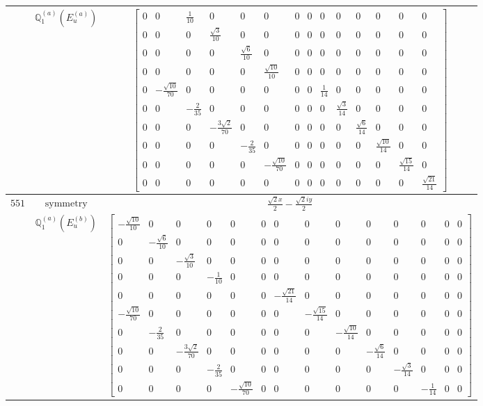 \documentclass[fleqn,8pt,landscape]{jsarticle}
\begin{document}
\begin{longtable}{ccc}
$  $ & $ \mathbb{Q}_{1}^{(a)}(E_{u}^{(a)}) $ & $ \begin{bmatrix} 0 & 0 & \frac{1}{10} & 0 & 0 & 0 & 0 & 0 & 0 & 0 & 0 & 0 & 0 & 0 \\ 0 & 0 & 0 & \frac{\sqrt{3}}{10} & 0 & 0 & 0 & 0 & 0 & 0 & 0 & 0 & 0 & 0 \\ 0 & 0 & 0 & 0 & \frac{\sqrt{6}}{10} & 0 & 0 & 0 & 0 & 0 & 0 & 0 & 0 & 0 \\ 0 & 0 & 0 & 0 & 0 & \frac{\sqrt{10}}{10} & 0 & 0 & 0 & 0 & 0 & 0 & 0 & 0 \\ 0 & - \frac{\sqrt{10}}{70} & 0 & 0 & 0 & 0 & 0 & 0 & \frac{1}{14} & 0 & 0 & 0 & 0 & 0 \\ 0 & 0 & - \frac{2}{35} & 0 & 0 & 0 & 0 & 0 & 0 & \frac{\sqrt{3}}{14} & 0 & 0 & 0 & 0 \\ 0 & 0 & 0 & - \frac{3 \sqrt{2}}{70} & 0 & 0 & 0 & 0 & 0 & 0 & \frac{\sqrt{6}}{14} & 0 & 0 & 0 \\ 0 & 0 & 0 & 0 & - \frac{2}{35} & 0 & 0 & 0 & 0 & 0 & 0 & \frac{\sqrt{10}}{14} & 0 & 0 \\ 0 & 0 & 0 & 0 & 0 & - \frac{\sqrt{10}}{70} & 0 & 0 & 0 & 0 & 0 & 0 & \frac{\sqrt{15}}{14} & 0 \\ 0 & 0 & 0 & 0 & 0 & 0 & 0 & 0 & 0 & 0 & 0 & 0 & 0 & \frac{\sqrt{21}}{14} \end{bmatrix} $ \\ \hline
$ 551 $ & $ \text{symmetry} $ & $ \frac{\sqrt{2} x}{2} - \frac{\sqrt{2} i y}{2} $ \\
$  $ & $ \mathbb{Q}_{1}^{(a)}(E_{u}^{(b)}) $ & $ \begin{bmatrix} - \frac{\sqrt{10}}{10} & 0 & 0 & 0 & 0 & 0 & 0 & 0 & 0 & 0 & 0 & 0 & 0 & 0 \\ 0 & - \frac{\sqrt{6}}{10} & 0 & 0 & 0 & 0 & 0 & 0 & 0 & 0 & 0 & 0 & 0 & 0 \\ 0 & 0 & - \frac{\sqrt{3}}{10} & 0 & 0 & 0 & 0 & 0 & 0 & 0 & 0 & 0 & 0 & 0 \\ 0 & 0 & 0 & - \frac{1}{10} & 0 & 0 & 0 & 0 & 0 & 0 & 0 & 0 & 0 & 0 \\ 0 & 0 & 0 & 0 & 0 & 0 & - \frac{\sqrt{21}}{14} & 0 & 0 & 0 & 0 & 0 & 0 & 0 \\ - \frac{\sqrt{10}}{70} & 0 & 0 & 0 & 0 & 0 & 0 & - \frac{\sqrt{15}}{14} & 0 & 0 & 0 & 0 & 0 & 0 \\ 0 & - \frac{2}{35} & 0 & 0 & 0 & 0 & 0 & 0 & - \frac{\sqrt{10}}{14} & 0 & 0 & 0 & 0 & 0 \\ 0 & 0 & - \frac{3 \sqrt{2}}{70} & 0 & 0 & 0 & 0 & 0 & 0 & - \frac{\sqrt{6}}{14} & 0 & 0 & 0 & 0 \\ 0 & 0 & 0 & - \frac{2}{35} & 0 & 0 & 0 & 0 & 0 & 0 & - \frac{\sqrt{3}}{14} & 0 & 0 & 0 \\ 0 & 0 & 0 & 0 & - \frac{\sqrt{10}}{70} & 0 & 0 & 0 & 0 & 0 & 0 & - \frac{1}{14} & 0 & 0 \end{bmatrix} $ \\ \hline

\end{longtable}
\end{document}
